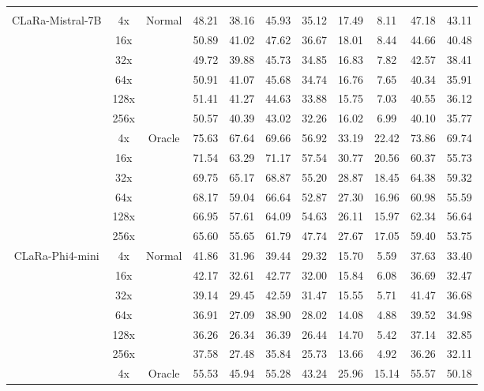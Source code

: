 \documentclass{applemlr}
\numberwithin{equation}{section}
\begin{document}
\begin{table}[!htbp]
\begin{tabular}{c|c|c|cc|cc|cc|cc}
\hline
\rowcolor{gray!15}
\multicolumn{11}{c}{\textbf{Instruction-tuned-initialized}} \\
\multirow{12}{*}{CLaRa-Mistral-7B} & 4x & \multirow{6}{*}{Normal} & 48.21 & 38.16 & 45.93 & 35.12 & 17.49 &  8.11 & 47.18 &  43.11 \\
& 16x & & 50.89 &  41.02 & 47.62 & 36.67 & 18.01 & 8.44 & 44.66 &  40.48  \\
 & 32x &  & 49.72 &  39.88 & 45.73 & 34.85 & 16.83 &7.82 & 42.57 &  38.41  \\
& 64x &  & 50.91 &  41.07 & 45.68 & 34.74 & 16.76 & 7.65 & 40.34 &  35.91 \\
 & 128x &  & 51.41 &  41.27 & 44.63 &  33.88 & 15.75 & 7.03 & 40.55 &  36.12  \\
 & 256x &  & 50.57 &  40.39 & 43.02 & 32.26 & 16.02 & 6.99 & 40.10 &35.77  \\
  \cline{2-11}

    &  4x& \multirow{6}{*}{Oracle}  & 75.63 &  67.64 & 69.66 &56.92 & 33.19 & 22.42 & 73.86 & 69.74\\

 & 16x &  & 71.54 & 63.29 & 71.17  & 57.54 & 30.77 &  20.56 & 60.37 &  55.73 \\

 & 32x &  & 69.75 & 65.17 &  68.87 & 55.20 & 28.87 & 18.45 & 64.38 &  59.32 \\

 & 64x &  & 68.17 &  59.04 & 66.64 & 52.87 & 27.30 &16.96 & 60.98 &  55.59 \\

 &  128x&  & 66.95 &  57.61 & 64.09 & 54.63 & 26.11 & 15.97 & 62.34 &  56.64 \\

 & 256x &  & 65.60 & 55.65 & 61.79 & 47.74 & 27.67 & 17.05 & 59.40 & 53.75  \\ 
\cline{2-11}
 \multirow{12}{*}{CLaRa-Phi4-mini} & 4x &  \multirow{6}{*}{Normal} & 41.86 &  31.96 & 39.44 & 29.32 & 15.70 & 5.59 & 37.63 & 33.40  \\
 & 16x &  & 42.17 & 32.61 & 42.77 & 32.00 & 15.84 & 6.08 & 36.69 & 32.47 \\
 & 32x &  & 39.14 &  29.45 & 42.59 &  31.47 & 15.55 & 5.71 & 41.47 & 36.68 \\
 & 64x &  & 36.91 &27.09 & 38.90 &  28.02 & 14.08 &  4.88 & 39.52 & 34.98  \\
 & 128x &  & 36.26 &  26.34 & 36.39  & 26.44 & 14.70 &  5.42 & 37.14 &  32.85 \\
 & 256x &  & 37.58 & 27.48 & 35.84 & 25.73 & 13.66 &  4.92 & 36.26 & 32.11 \\
\cline{2-11}
 & 4x & \multirow{6}{*}{Oracle}  & 55.53 & 45.94 & 55.28 &  43.24 & 25.96 & 15.14 & 55.57 &  50.18  \\


\end{tabular}
\end{table}
\end{document}
